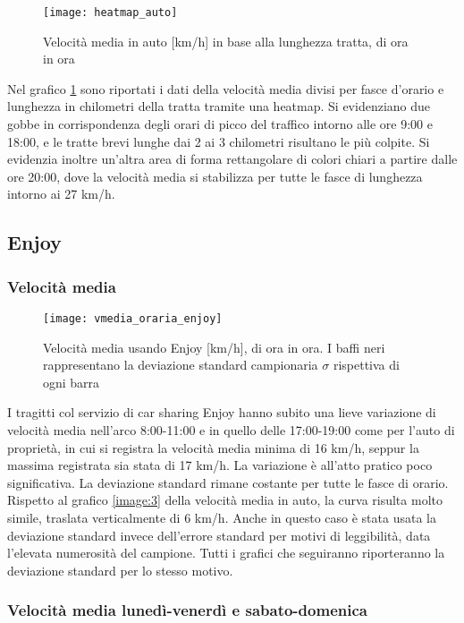 \begin{figure}[H]
\texttt{[image: heatmap\_auto]}
\caption{Velocità media in auto [km/h] in base alla lunghezza tratta, di ora in ora}
\label{image:6}
\end{figure}

Nel grafico \ref{image:6} sono riportati i dati della velocità media divisi per fasce d'orario e lunghezza in chilometri della tratta tramite una heatmap. Si evidenziano due gobbe in corrispondenza degli orari di picco del traffico intorno alle ore 9:00 e 18:00, e le tratte brevi lunghe dai 2 ai 3 chilometri risultano le più colpite. Si evidenzia inoltre un'altra area di forma rettangolare di colori chiari a partire dalle ore 20:00, dove la velocità media si stabilizza per tutte le fasce di lunghezza intorno ai 27 km/h.

\subsection{Enjoy}

\subsubsection{Velocità media}

\begin{figure}[H]
\texttt{[image: vmedia\_oraria\_enjoy]}
\caption{Velocità media usando Enjoy [km/h], di ora in ora.  I baffi neri rappresentano la deviazione standard campionaria $\sigma$ rispettiva di ogni barra}
\label{image:7}
\end{figure}

I tragitti col servizio di car sharing Enjoy hanno subito una lieve variazione di velocità media nell'arco 8:00-11:00 e in quello delle 17:00-19:00 come per l'auto di proprietà, in cui si registra la velocità media minima di 16 km/h, seppur la massima registrata sia stata di 17 km/h. La variazione è all'atto pratico poco significativa. La deviazione standard rimane costante per tutte le fasce di orario. Rispetto al grafico \ref{image:3} della velocità media in auto, la curva risulta molto simile, traslata verticalmente di 6 km/h. Anche in questo caso è stata usata la deviazione standard invece dell'errore standard per motivi di leggibilità, data l'elevata numerosità del campione. Tutti i grafici che seguiranno riporteranno la deviazione standard per lo stesso motivo.

\subsubsection{Velocità media lunedì-venerdì e sabato-domenica}

